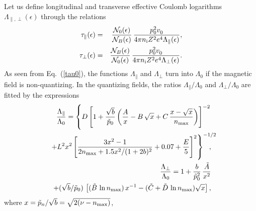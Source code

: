 \documentclass{aa}
\newcommand{\req}[1]{Eq.~(\ref{#1})}
\newcommand{\Ne}{{\cal N}_B(\epsilon)}
\newcommand{\Necl}{{\cal N}_0(\epsilon)}
\begin{document}
Let us define longitudinal and transverse
effective Coulomb logarithms
$\Lambda_{\|,\perp}(\epsilon)$ through the relations
\begin{eqnarray}
   \tau_\|(\epsilon) &=& {\Necl\over\Ne}\,
       {p_0^2 v_0^{\phantom{2}} \over
              4\pi n_{\rm i} Z^2 e^4 \Lambda_\|(\epsilon)},
\label{taupar}
\\
   \tau_\perp(\epsilon) &=& {\Ne\over\Necl}\,
       {p_0^2 v_0^{\phantom{2}} \over
              4\pi n_{\rm i} Z^2 e^4 \Lambda_\perp(\epsilon)}.
\label{tauperp}
\end{eqnarray}
As seen from \req{tau0}, the functions
$\Lambda_\|$ and $\Lambda_\perp$ turn into $\Lambda_0$
if the magnetic field is non-quantizing.
In the quantizing fields, the ratios $\Lambda_{\|}/\Lambda_0$
and $\Lambda_\perp/\Lambda_0$ are fitted by the expressions
\begin{eqnarray}
&&\hspace*{-.9em}\!
   {\Lambda_\|\over\Lambda_0} =
       \left\{ D \left[ 1 + {\sqrt{b}\over\tilde p_0}
           \left( {A\over x} - B\,\sqrt{x}
               + C\,{x-\sqrt{x}\over n_{\rm max} } \right) \right]^{-2}
\right.\nonumber\\&&\hspace*{-.9em}\left.
    +  L^2 x^2 \left[ {3x^2-1\over 2 n_{\rm max} + 1.5 x^2/(1+2b)^2}
              +0.07 + {E\over5} 
          \vphantom{\sqrt{b}\over\tilde p_0} 
\right]^2 
\right\}^{-1/2}
\hspace*{-1.2em},
\label{Lpar}
\\&&\hspace*{-.9em}
   {\Lambda_\perp\over\Lambda_0} =
       1 + {b\over\tilde p_0^2}\,{\tilde A\over x^2}
\nonumber\\&&\hspace*{-.9em}
        +(\sqrt{b}/\tilde p_0)\,
         \left[(\tilde B\,\ln n_{\rm max})\, x^{-1}
            - (\tilde C + \tilde D\,\ln n_{\rm max})\sqrt{x} \right],
\label{Lperp}
\end{eqnarray}
where $x = \tilde p_n/\sqrt{b} = \sqrt{2(\nu-n_{\rm max})}$,
\end{document}
